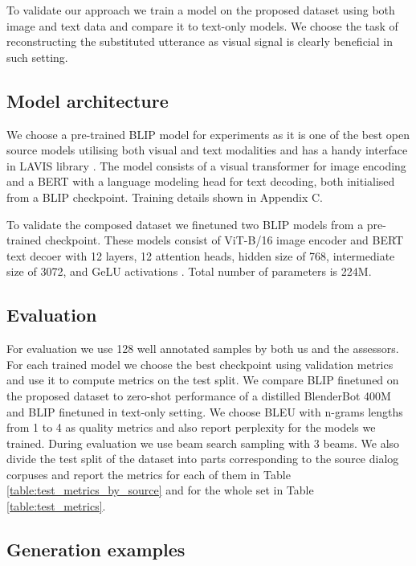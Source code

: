 To validate our approach we train a model on the proposed dataset using both image and text data and compare it to text-only models. We choose the task of reconstructing the substituted utterance as visual signal is clearly beneficial in such setting.

\subsection{Model architecture}

We choose a pre-trained BLIP \cite{blip} model for experiments as it is one of the best open source models utilising both visual and text modalities and has a handy interface in LAVIS library \cite{lavis}. The model consists of a visual transformer \cite{vit} for image encoding and a BERT \cite{bert} with a language modeling head for text decoding, both initialised from a BLIP checkpoint. Training details shown in Appendix C.

\medskip

To validate the composed dataset we finetuned two BLIP models from a pre-trained checkpoint. These models consist of ViT-B/16 image encoder and BERT text decoer with 12 layers, 12 attention heads, hidden size of 768, intermediate size of 3072, and GeLU activations \cite{gelu}. Total number of parameters is 224M.


\subsection{Evaluation}

For evaluation we use 128 well annotated samples by both us and the assessors. For each trained model we choose the best checkpoint using validation metrics and use it to compute metrics on the test split. We compare BLIP finetuned on the proposed dataset to zero-shot performance of a distilled BlenderBot 400M \cite{blenderbot} and BLIP finetuned in text-only setting. We choose BLEU \cite{bleu} with n-grams lengths from 1 to 4 as quality metrics and also report perplexity for the models we trained. During evaluation we use beam search sampling with 3 beams. We also divide the test split of the dataset into parts corresponding to the source dialog corpuses and report the metrics for each of them in Table \ref{table:test_metrics_by_source} and for the whole set in Table \ref{table:test_metrics}.

\subsection{Generation examples}

